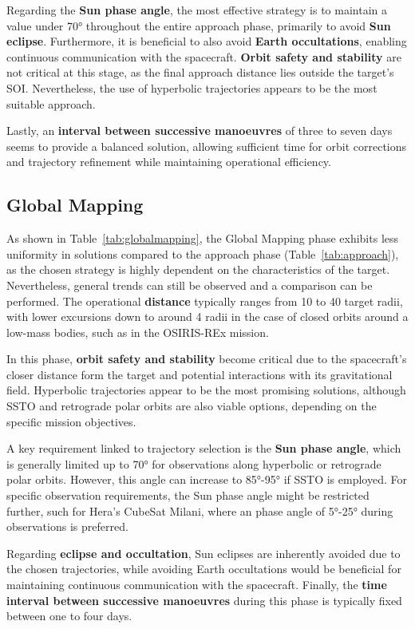 \documentclass{Configuration_gigi/PoliMi3i_thesis}
\begin{document}
Regarding the \textbf{Sun phase angle}, the most effective strategy is to maintain a value under 70° throughout the entire approach phase, primarily to avoid \textbf{Sun eclipse}. Furthermore, it is beneficial to also avoid \textbf{Earth occultations}, enabling continuous communication with the spacecraft. \textbf{Orbit safety and stability} are not critical at this stage, as the final approach distance lies outside the target's SOI. Nevertheless, the use of hyperbolic trajectories appears to be the most suitable approach. 

Lastly, an \textbf{interval between successive manoeuvres} of three to seven days seems to provide a balanced solution, allowing sufficient time for orbit corrections and trajectory refinement while maintaining operational efficiency.


\subsection{Global Mapping}\label{Ssec:Global Mapping}

As shown in Table~\ref{tab:globalmapping}, the Global Mapping phase exhibits less uniformity in solutions compared to the approach phase (Table~\ref{tab:approach}), as the chosen strategy is highly dependent on the characteristics of the target. Nevertheless, general trends can still be observed and a comparison can be performed. The operational \textbf{distance} typically ranges from 10 to 40 target radii, with lower excursions down to around 4 radii in the case of closed orbits around a low-mass bodies, such as in the OSIRIS-REx mission. 

In this phase, \textbf{orbit safety and stability} become critical due to the spacecraft's closer distance form the target and potential interactions with its gravitational field. Hyperbolic trajectories appear to be the most promising solutions, although SSTO and retrograde polar orbits are also viable options, depending on the specific mission objectives.

A key requirement linked to trajectory selection is the \textbf{Sun phase angle}, which is generally limited up to 70° for observations along hyperbolic or retrograde polar orbits. However, this angle can increase to 85°-95° if SSTO is employed. For specific observation requirements, the Sun phase angle might be restricted further, such for Hera's CubeSat Milani, where an phase angle of 5°-25° during observations is preferred.

Regarding \textbf{eclipse and occultation}, Sun eclipses are inherently avoided due to the chosen trajectories, while avoiding Earth occultations would be beneficial for maintaining continuous communication with the spacecraft. Finally, the \textbf{time interval between successive manoeuvres} during this phase is typically fixed between one to four days.
\end{document}
